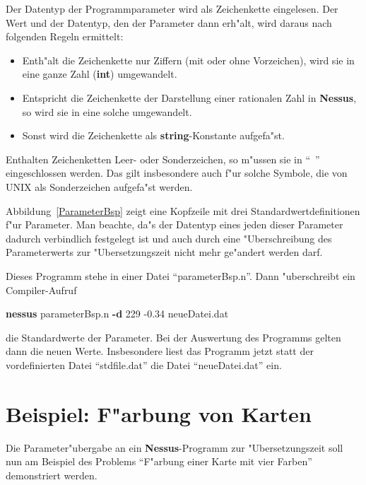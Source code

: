 Der Datentyp der Programmparameter   wird als
Zeichenkette eingelesen. Der
Wert und der Datentyp, den der Parameter dann erh"alt, wird daraus
nach folgenden Regeln ermittelt:

\begin{itemize}
  \item Enth"alt die Zeichenkette nur Ziffern (mit oder ohne
Vorzeichen), wird sie in eine ganze Zahl ({\bf int}) umgewandelt.  
  \item Entspricht die Zeichenkette der Darstellung einer rationalen
Zahl in {\bf Nessus}, so wird sie in eine solche umgewandelt.
  \item Sonst wird die Zeichenkette als {\bf
string}-Konstante aufgefa"st. 
\end{itemize}

Enthalten Zeichenketten Leer- oder Sonderzeichen, so m"ussen sie in
``~'' eingeschlossen werden. Das gilt insbesondere auch f"ur solche
Symbole, die von UNIX als Sonderzeichen aufgefa"st werden.

Abbildung~\ref{ParameterBsp} zeigt eine Kopfzeile mit drei Standardwertdefinitionen f"ur Parameter.  Man
beachte, da"s der Datentyp eines jeden dieser Parameter dadurch
verbindlich festgelegt ist und auch durch eine "Uberschreibung des
Parameterwerts zur "Ubersetzungszeit nicht mehr ge"andert werden darf.

Dieses Programm stehe in einer Datei ``parameterBsp.n''. Dann
"uberschreibt ein Compiler-Aufruf
 
\centerline{{\bf nessus} parameterBsp.n {\bf -d} 229 -0.34 neueDatei.dat} 

die Standardwerte der Parameter. Bei der Auswertung des Programms
gelten dann die neuen Werte. Insbesondere liest das Programm jetzt
statt der vordefinierten Datei ``stdfile.dat'' die Datei
``neueDatei.dat'' ein.


\section{Beispiel: F"arbung von  Karten}

Die Parameter"ubergabe an ein {\bf Nessus}-Programm zur
"Ubersetzungszeit soll nun am Beispiel des Problems ``F"arbung einer
Karte mit vier Farben'' demonstriert werden.

